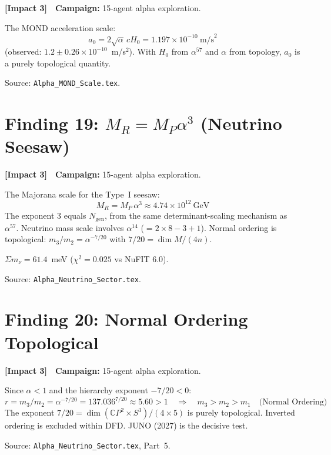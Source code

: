\documentclass[11pt,a4paper]{article}
\newcommand{\impactthree}{\textcolor{impact3}{\textbf{[Impact 3]}}}
\newcommand{\CP}{\mathbb{C}P}
\begin{document}
\impactthree\ \ \textbf{Campaign:} 15-agent alpha exploration.

The MOND acceleration scale:
\[
a_0 = 2\sqrt{\alpha}\,cH_0 = 1.197 \times 10^{-10}~\text{m/s}^2
\]
(observed: $1.2 \pm 0.26 \times 10^{-10}$~m/s$^2$). With $H_0$ from
$\alpha^{57}$ and $\alpha$ from topology, $a_0$ is a purely topological
quantity.

Source: \texttt{Alpha\_MOND\_Scale.tex}.


\section{Finding 19: $M_R = M_P \alpha^3$ (Neutrino Seesaw)}
\label{sec:seesaw}

\impactthree\ \ \textbf{Campaign:} 15-agent alpha exploration.

The Majorana scale for the Type~I seesaw:
\[
M_R = M_P\,\alpha^3 \approx 4.74 \times 10^{12}~\text{GeV}
\]
The exponent 3 equals $N_{\mathrm{gen}}$, from the same determinant-scaling
mechanism as $\alpha^{57}$. Neutrino mass scale involves $\alpha^{14}$
($= 2 \times 8 - 3 + 1$). Normal ordering is topological: $m_3/m_2 =
\alpha^{-7/20}$ with $7/20 = \dim M/(4n)$.

$\Sigma m_\nu = 61.4$~meV ($\chi^2 = 0.025$ vs NuFIT 6.0).

Source: \texttt{Alpha\_Neutrino\_Sector.tex}.


\section{Finding 20: Normal Ordering Topological}
\label{sec:normal-ordering}

\impactthree\ \ \textbf{Campaign:} 15-agent alpha exploration.

Since $\alpha < 1$ and the hierarchy exponent $-7/20 < 0$:
\[
r = m_3/m_2 = \alpha^{-7/20} = 137.036^{7/20} \approx 5.60 > 1
\quad\Longrightarrow\quad m_3 > m_2 > m_1 \quad\text{(Normal Ordering)}
\]
The exponent $7/20 = \dim(\CP^2 \times S^3)/(4 \times 5)$ is purely
topological. Inverted ordering is excluded within DFD. JUNO (2027) is
the decisive test.

Source: \texttt{Alpha\_Neutrino\_Sector.tex}, Part~5.
\end{document}
